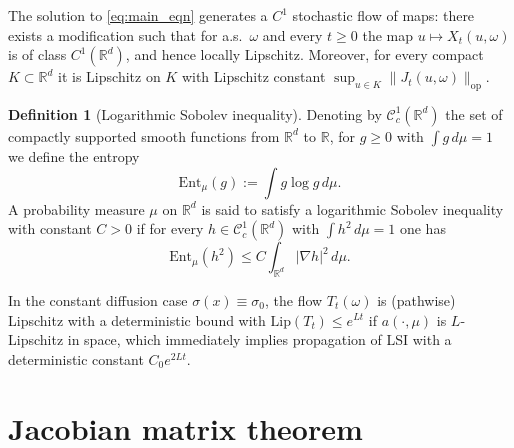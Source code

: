 \documentclass{tsp-short}
\theoremstyle{remark}
\theoremstyle{definition}
\newtheorem{definition}{Definition}[section]
\newcommand{\Ent}{\mathrm{Ent}}
\begin{document}
The solution to \eqref{eq:main_eqn} generates a $C^1$ stochastic flow of maps: there exists a modification such that for a.s.\ $\omega$ and every $t\ge 0$ the map
$u\mapsto X_t(u,\omega)$ is of class $C^1(\mathbb{R}^d)$, and hence locally Lipschitz.
Moreover, for every compact $K\subset\mathbb{R}^d$ it is Lipschitz on $K$ with Lipschitz constant $\sup_{u\in K}\|J_t(u,\omega)\|_{\mathrm{op}}$.
\medskip

\fi

\begin{definition}[Logarithmic Sobolev inequality]
Denoting by $\mathcal{C}^1_c(\mathbb{R}^d)$ the set of compactly supported smooth functions from $\mathbb{R}^d$ to $\mathbb{R}$, for $g\ge 0$ with $\int g\,d\mu=1$ we define the entropy
\begin{equation*}
\Ent_\mu(g):=\int g\log g\,d\mu.
\end{equation*}
A probability measure $\mu$ on $\mathbb{R}^d$ is said to satisfy a logarithmic Sobolev inequality with constant $C>0$ if for every $h\in\mathcal{C}^1_c(\mathbb{R}^d)$ with $\int h^2\,d\mu=1$ one has
\begin{equation}
\Ent_\mu(h^2)\le C\int_{\mathbb{R}^d}|\nabla h|^2\,d\mu.
\label{eq:lsi_def}
\end{equation}
\end{definition}


In the constant diffusion case $\sigma(x)\equiv \sigma_0$, the flow $T_t(\omega)$ is (pathwise) Lipschitz with a deterministic bound with $\mathrm{Lip}(T_t)\le e^{Lt}$ if $a(\cdot,\mu)$ is $L$-Lipschitz in space, which immediately implies propagation of LSI with a deterministic constant $C_0 e^{2Lt}$.






























\section{Jacobian matrix theorem}\label{sec:jacobian-theorem}
\end{document}
